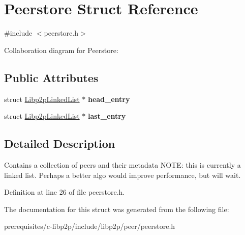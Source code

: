 \hypertarget{struct_peerstore}{}\section{Peerstore Struct Reference}
\label{struct_peerstore}


{\ttfamily \#include $<$peerstore.\+h$>$}



Collaboration diagram for Peerstore\+:
\subsection*{Public Attributes}
\begin{DoxyCompactItemize}
\item 
\mbox{\label{struct_peerstore_a487d4ece620b048d1760a759802245be}} 
struct \mbox{\hyperlink{struct_libp2p_linked_list}{Libp2p\+Linked\+List}} $\ast$ {\bfseries head\+\_\+entry}
\item 
\mbox{\label{struct_peerstore_a98787b9042843d641e73ae4f1a3e79a5}} 
struct \mbox{\hyperlink{struct_libp2p_linked_list}{Libp2p\+Linked\+List}} $\ast$ {\bfseries last\+\_\+entry}
\end{DoxyCompactItemize}


\subsection{Detailed Description}
Contains a collection of peers and their metadata N\+O\+TE\+: this is currently a linked list. Perhaps a better algo would improve performance, but will wait. 

Definition at line 26 of file peerstore.\+h.



The documentation for this struct was generated from the following file\+:\begin{DoxyCompactItemize}
\item 
prerequisites/c-\/libp2p/include/libp2p/peer/peerstore.\+h\end{DoxyCompactItemize}
